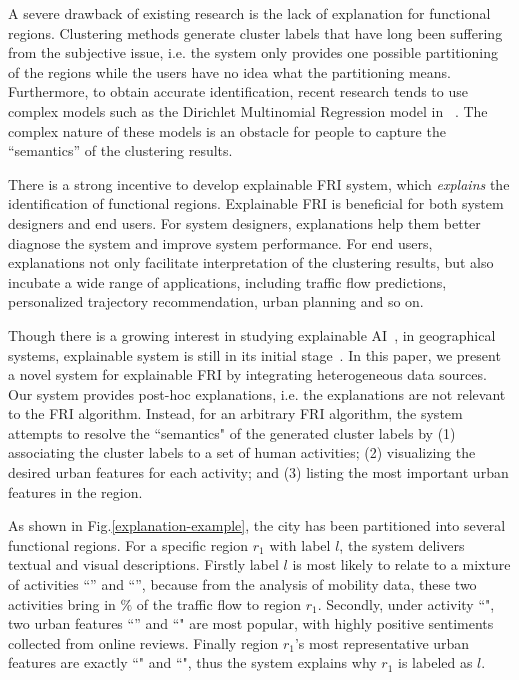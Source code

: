 \documentclass[runningheads]{llncs}
\begin{document}
A severe drawback of existing research is the lack of explanation for functional regions.
Clustering methods generate cluster labels that have long been suffering from the subjective issue, i.e. the system only provides one possible partitioning of the regions while the users have no idea what the partitioning means. 
Furthermore, to obtain accurate identification, recent research tends to use complex models such as the Dirichlet Multinomial Regression model in~\cite{Yuan2015FunctionRegion} . 
The complex nature of these models is an obstacle for people to capture the ``semantics'' of the clustering results. 

There is a strong incentive to develop explainable FRI system, which \emph{explains} the identification of functional regions. 
Explainable FRI is beneficial for both system designers and end users.
For system designers, explanations help them better diagnose the system and improve system performance. 
For end users, explanations not only facilitate interpretation of the clustering results, but also incubate a wide range of applications, including traffic flow predictions, personalized trajectory recommendation, urban planning and so on. 

Though there is a growing interest in studying explainable AI~\cite{Preece2018ExplainAI}, in geographical systems, explainable system is still in its initial stage~\cite{Korpan2017navigation,Jose2018cognitive}.
In this paper, we present a novel system for explainable FRI by integrating heterogeneous data sources. Our system provides post-hoc explanations, i.e. the explanations are not relevant to the FRI algorithm. Instead, for an arbitrary FRI algorithm, the system attempts to resolve the ``semantics" of the generated cluster labels by (1) associating the cluster labels to a set of human activities; (2) visualizing the desired urban features for each activity; and (3) listing the most important urban features in the region. 

As shown in Fig.\ref{explanation-example}, the city has been partitioned into several functional regions. For a specific region $r_1$ with label $l$, the system delivers textual and visual descriptions. Firstly label $l$ is most likely to relate to a mixture of activities ``'' and ``'', because from the analysis of mobility data, these two activities bring in $\%$ of the traffic flow to region $r_1$. Secondly, under activity ``", two urban features ``'' and ``" are most popular, with highly positive sentiments collected from online reviews. Finally region $r_1$'s most representative urban features are exactly ``" and ``", thus the system explains why $r_1$ is labeled as $l$.  
\end{document}
